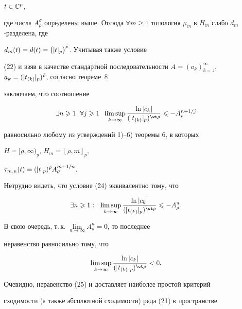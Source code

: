 $t\in\Bbb C^p$,


где числа $A^\sigma_\rho$ определены выше. Отсюда $\forall


m\geqslant 1$ топология $\mu_m$ в $H_m$ слабо $d_m$-разделена, где


$d_m(t)=d(t)=\bigl(|t|_p\bigr)^{\Tilde \rho}$. Учитывая также условие


(22) и взяв в качестве стандартной последовательности $A=(a_k)


_{k=1}^{\infty}$, $a_k=(|t_{(k)}|_p)^{\Tilde \rho}$, согласно теореме~8


заключаем, что соотношение


\begin{equation}


\exists n\geqslant 1\ \; \forall j\geqslant 1\ \;


\limsup\limits_{k\to\infty}\dfrac{\ln|c_k|}{(|t_{(k)}|_p)^


{\wt\rho}}\leqslant -A_\rho^{n+1/j}


\end{equation}


равносильно любому из утверждений 1)--6) теоремы 6, в которых


$H=[\rho,\infty)_p$, $H_m=[\rho,m]_p$,


$\tau_{m,n}(t)=(|t|_p)^{\Tilde \rho}A_{\rho}^{m+1/n}$.





Нетрудно видеть, что условие (24) эквивалентно тому, что


$$


\exists n\geqslant 1:\ \;


\limsup\limits_{k\to\infty}\dfrac{\ln|c_k|}{(|t_{(k)}|_p)^


{\wt\rho}}\leqslant -A_\rho^n.


$$


В свою очередь, т.\,к. $\lim\limits_{n\to\infty}A^n_\rho=0$, то последнее


неравенство равносильно тому, что


\begin{equation}


\limsup\limits_{k\to\infty}\dfrac{\ln|c_k|}{(|t_{(k)}|_p)^


{\wt\rho}}<0.


\end{equation}


Очевидно, неравенство (25) и доставляет наиболее простой критерий


сходимости (а также абсолютной сходимости) ряда (21) в пространстве


